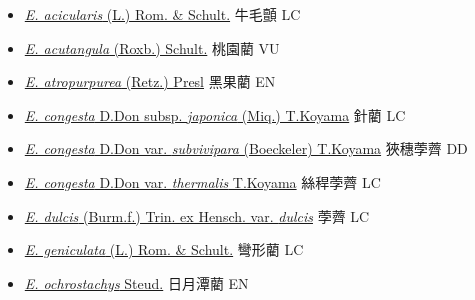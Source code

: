\begin{itemize}
  \begin{itemize}
        \item[] \href{http://www.theplantlist.org/tpl1.1/search?q=Eleocharis+acicularis}{\textit{E. acicularis} (L.) Rom. \& Schult.}   牛毛顫   LC
        \item[] \href{http://www.theplantlist.org/tpl1.1/search?q=Eleocharis+acutangula}{\textit{E. acutangula} (Roxb.) Schult.}   桃園藺   VU
        \item[] \href{http://www.theplantlist.org/tpl1.1/search?q=Eleocharis+atropurpurea}{\textit{E. atropurpurea} (Retz.) Presl}   黑果藺   EN
        \item[] \href{http://www.theplantlist.org/tpl1.1/search?q=Eleocharis+congesta+subsp.+japonica}{\textit{E. congesta} D.Don subsp. \textit{japonica} (Miq.) T.Koyama}   針藺   LC
        \item[] \href{http://www.theplantlist.org/tpl1.1/search?q=Eleocharis+congesta+var.+subvivipara}{\textit{E. congesta} D.Don var. \textit{subvivipara} (Boeckeler) T.Koyama}   狹穗荸薺   DD
        \item[] \href{http://www.theplantlist.org/tpl1.1/search?q=Eleocharis+congesta+var.+thermalis}{\textit{E. congesta} D.Don var. \textit{thermalis} T.Koyama}   絲稈荸薺   LC
        \item[] \href{http://www.theplantlist.org/tpl1.1/search?q=Eleocharis+dulcis+var.+dulcis}{\textit{E. dulcis} (Burm.f.) Trin. ex Hensch. var. \textit{dulcis}}   荸薺   LC
        \item[] \href{http://www.theplantlist.org/tpl1.1/search?q=Eleocharis+geniculata}{\textit{E. geniculata} (L.) Rom. \& Schult.}   彎形藺   LC
        \item[] \href{http://www.theplantlist.org/tpl1.1/search?q=Eleocharis+ochrostachys}{\textit{E. ochrostachys} Steud.}   日月潭藺   EN

\end{itemize}
\end{itemize}
